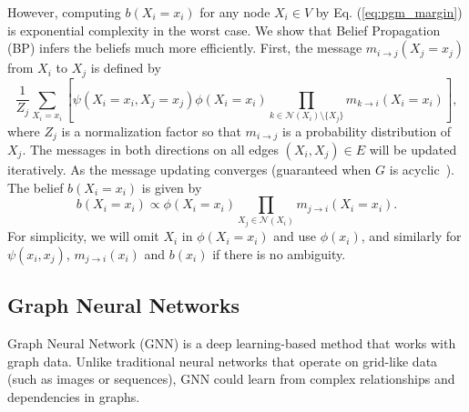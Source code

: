 However, computing $b(X_i=x_i)$ for any node $X_i \in V$ by Eq. (\ref{eq:pgm_margin}) is exponential complexity in the worst case. 
We show that Belief Propagation (BP) \cite{bishop2006pattern} infers the beliefs much more efficiently. 
First, the message $m_{i\to j}(X_j=x_j)$ from $X_i$ to $X_j$ is defined by
\begin{equation}
\label{eq:pgm_sum_prod}
\frac{1}{Z_j}\sum_{X_i=x_i}
\left[\psi(X_i=x_i, X_j=x_j)\phi(X_i=x_i) \prod_{k\in \mathcal{N}(X_i)\setminus \{X_j\}} m_{k\to i}(X_i=x_i)\right],
\end{equation}
where $Z_j$ is a normalization factor so that $m_{i\to j}$ is a probability distribution of $X_j$.
The messages in both directions on all edges $(X_i, X_j) \in E$ will be updated iteratively. 
As the message updating converges (guaranteed when $G$ is acyclic~\cite{pearl1988probabilistic}).
The belief $b(X_i=x_i)$ is given by
\begin{equation}
\label{eq:pgm_belief}
    b(X_i=x_i) \propto \phi(X_i=x_i)\prod_{X_j\in \mathcal{N}(X_i)} m_{j\to i}(X_i=x_i).
\end{equation}
For simplicity, we will omit $X_i$ in $\phi(X_i=x_i)$ and use $\phi(x_i)$, and similarly for $\psi(x_i,x_j)$, $m_{j\to i}(x_i)$ and $b(x_i)$ if there is no ambiguity.

\subsection{Graph Neural Networks}
Graph Neural Network (GNN) is a deep learning-based method that works with graph data. 
Unlike traditional neural networks that operate on grid-like data (such as images or sequences),  
GNN could learn from complex relationships and dependencies in graphs.


